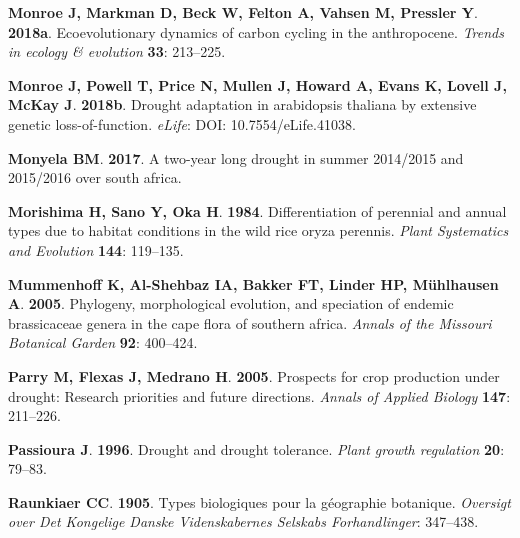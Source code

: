 \documentclass[man,floatsintext]{apa6}
\theoremstyle{definition}
\theoremstyle{definition}
\theoremstyle{definition}
\theoremstyle{remark}
\begin{document}
\leavevmode\hypertarget{ref-monroe2018ecoevolutionary}{}%
\textbf{\textnormal{Monroe J}, \textnormal{Markman D}, \textnormal{Beck
W}, \textnormal{Felton A}, \textnormal{Vahsen M}, \textnormal{Pressler
Y}}. \textbf{2018a}. Ecoevolutionary dynamics of carbon cycling in the
anthropocene. \emph{Trends in ecology \& evolution} \textbf{33}:
213--225.

\leavevmode\hypertarget{ref-monroe2018drought}{}%
\textbf{\textnormal{Monroe J}, \textnormal{Powell T}, \textnormal{Price
N}, \textnormal{Mullen J}, \textnormal{Howard A}, \textnormal{Evans K},
\textnormal{Lovell J}, \textnormal{McKay J}}. \textbf{2018b}. Drought
adaptation in arabidopsis thaliana by extensive genetic
loss-of-function. \emph{eLife}: DOI: 10.7554/eLife.41038.

\leavevmode\hypertarget{ref-monyela2017two}{}%
\textbf{\textnormal{Monyela BM}}. \textbf{2017}. A two-year long drought
in summer 2014/2015 and 2015/2016 over south africa.

\leavevmode\hypertarget{ref-morishima1984differentiation}{}%
\textbf{\textnormal{Morishima H}, \textnormal{Sano Y}, \textnormal{Oka
H}}. \textbf{1984}. Differentiation of perennial and annual types due to
habitat conditions in the wild rice oryza perennis. \emph{Plant
Systematics and Evolution} \textbf{144}: 119--135.

\leavevmode\hypertarget{ref-mummenhoff2005phylogeny}{}%
\textbf{\textnormal{Mummenhoff K}, \textnormal{Al-Shehbaz IA},
\textnormal{Bakker FT}, \textnormal{Linder HP}, \textnormal{Mühlhausen
A}}. \textbf{2005}. Phylogeny, morphological evolution, and speciation
of endemic brassicaceae genera in the cape flora of southern africa.
\emph{Annals of the Missouri Botanical Garden} \textbf{92}: 400--424.

\leavevmode\hypertarget{ref-parry2005prospects}{}%
\textbf{\textnormal{Parry M}, \textnormal{Flexas J}, \textnormal{Medrano
H}}. \textbf{2005}. Prospects for crop production under drought:
Research priorities and future directions. \emph{Annals of Applied
Biology} \textbf{147}: 211--226.

\leavevmode\hypertarget{ref-passioura1996drought}{}%
\textbf{\textnormal{Passioura J}}. \textbf{1996}. Drought and drought
tolerance. \emph{Plant growth regulation} \textbf{20}: 79--83.

\leavevmode\hypertarget{ref-raunkiaer1905types}{}%
\textbf{\textnormal{Raunkiaer CC}}. \textbf{1905}. Types biologiques
pour la géographie botanique. \emph{Oversigt over Det Kongelige Danske
Videnskabernes Selskabs Forhandlinger}: 347--438.
\end{document}
